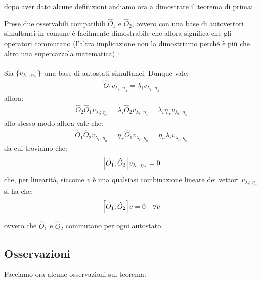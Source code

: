 	dopo aver dato alcune definizioni andiamo ora a dimostrare il teorema di prima:

\begin{myprf}

	Prese due osservabili compatibili $\hat{O}_1$ e $\hat{O}_2$, ovvero con una base di autovettori simultanei in comune è facilmente dimostrabile che allora significa che gli operatori commutano (l'altra implicazione non la dimostriamo perché è più che altro una supercazzola matematica) :
	\\
	\\
	Sia $\qty{v_{\lambda_i; \, \eta_{\alpha}}}$ una base di autostati simultanei. Dunque vale:
\begin{align*}
	\hat{O}_1 v_{\lambda_i; \,\eta_{\alpha}} = \lambda_i v_{\lambda_i;\, \eta_{\alpha}}
\end{align*}
	allora:
\begin{align*}
	\hat{O}_2\hat{O}_1 v_{\lambda_i;\, \eta_{\alpha}} = \lambda_i \hat{O}_2 v_{\lambda_i;\, \eta_{\alpha}} = \lambda_i \eta_{\alpha} v_{\lambda_i;\, \eta_{\alpha}} 
\end{align*}
	allo stesso modo allora vale che:
\begin{align*}
	\hat{O}_1\hat{O}_2 v_{\lambda_i;\, \eta_{\alpha}} = \eta_{\alpha} \hat{O}_1 v_{\lambda_i;\, \eta_{\alpha}} = \eta_{\alpha} \lambda_i v_{\lambda_i;\, \eta_{\alpha}} 
\end{align*}
	da cui troviamo che:
\begin{align*}
	\qty[\hat{O}_1, \hat{O}_2] v_{\lambda_i;\, \eta_{\alpha}} = 0
\end{align*}
	che, per linearità, siccome $v$ è una qualsiasi combinazione lineare dei vettori $v_{\lambda_i;\, \eta_{\alpha}}$ si ha che:
\begin{align*}
	\qty[\hat{O}_1, \hat{O}_2] v = 0 \quad \forall v
\end{align*}

	ovvero che $\hat{O}_1$ e $\hat{O}_2$ commutano per ogni autostato. 
	
\end{myprf}

\subsection{Osservazioni}

	Facciamo ora alcune osservazioni sul teorema:
	
